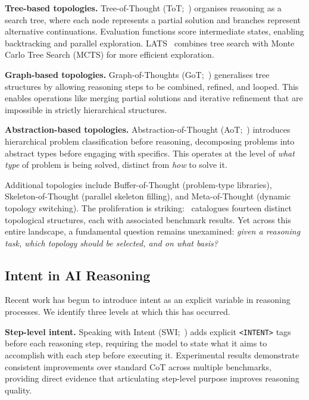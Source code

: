 \documentclass[11pt,a4paper]{article}
\begin{document}
\textbf{Tree-based topologies.} Tree-of-Thought (ToT;~\citealt{yao2023tree}) organises reasoning as a search tree, where each node represents a partial solution and branches represent alternative continuations. Evaluation functions score intermediate states, enabling backtracking and parallel exploration. LATS~\citep{zhou2023lats} combines tree search with Monte Carlo Tree Search (MCTS) for more efficient exploration.

\textbf{Graph-based topologies.} Graph-of-Thoughts (GoT;~\citealt{besta2024graph}) generalises tree structures by allowing reasoning steps to be combined, refined, and looped. This enables operations like merging partial solutions and iterative refinement that are impossible in strictly hierarchical structures.

\textbf{Abstraction-based topologies.} Abstraction-of-Thought (AoT;~\citealt{hong2024abstraction}) introduces hierarchical problem classification before reasoning, decomposing problems into abstract types before engaging with specifics. This operates at the level of \emph{what type} of problem is being solved, distinct from \emph{how} to solve it.

Additional topologies include Buffer-of-Thought (problem-type libraries), Skeleton-of-Thought (parallel skeleton filling), and Meta-of-Thought (dynamic topology switching). The proliferation is striking:~\citet{besta2025topologies} catalogues fourteen distinct topological structures, each with associated benchmark results. Yet across this entire landscape, a fundamental question remains unexamined: \emph{given a reasoning task, which topology should be selected, and on what basis?}

\subsection{Intent in AI Reasoning}

Recent work has begun to introduce intent as an explicit variable in reasoning processes. We identify three levels at which this has occurred.

\textbf{Step-level intent.} Speaking with Intent (SWI;~\citealt{yin2025swi}) adds explicit \texttt{<INTENT>} tags before each reasoning step, requiring the model to state what it aims to accomplish with each step before executing it. Experimental results demonstrate consistent improvements over standard CoT across multiple benchmarks, providing direct evidence that articulating step-level purpose improves reasoning quality.
\end{document}
